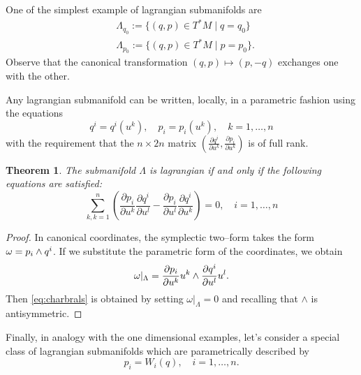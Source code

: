 \documentclass[english,fontsize=11pt,paper=a5,oneside]{scrbook}
\let\d\relax
\DeclareMathOperator{\d}{d}
\newtheorem{theorem}{Theorem}[chapter]
\theoremstyle{definition}
\newenvironment{example}
  {\pushQED{\qed}\renewcommand{\qedsymbol}{$\lozenge$}\examplex}
  {\popQED\endexamplex}
\begin{document}
\begin{example}
    One of the simplest example of lagrangian submanifolds are
    \begin{align}
        &\Lambda_{q_0} := \big\{(q,p)\in T^*M \mid q=q_0\big\}\\
        &\Lambda_{p_0} := \big\{(q,p)\in T^*M \mid p=p_0\big\}.
    \end{align}
    Observe that the canonical transformation $(q,p) \mapsto (p,-q)$ exchanges one with the other.
\end{example}

Any lagrangian submanifold can be written, locally, in a parametric fashion using the equations
\begin{equation}
    q^i = q^i(u^k), \quad p_i = p_i(u^k), \quad k=1,\ldots,n
\end{equation}
with the requirement that the $n\times2n$ matrix $\left(\frac{\partial q^i}{\partial u^k}, \frac{\partial p_i}{\partial u^k}\right)$ is of full rank.

\begin{theorem}\label{thm:charbrals}
    The submanifold $\Lambda$ is lagrangian if and only if the following equations are satisfied:
    \begin{equation}\label{eq:charbrals}
        \sum_{k,k=1}^n \left(\frac{\partial p_i}{\partial u^k}\frac{\partial q^i}{\partial u^l} - \frac{\partial p_i}{\partial u^l}\frac{\partial q^i}{\partial u^k} \right) = 0,
        \quad i=1,\ldots,n
    \end{equation}
\end{theorem}
\begin{proof}
    In canonical coordinates, the symplectic two--form takes the form $\omega = \d p_i \wedge \d q^i$. If we substitute the parametric form of the coordinates, we obtain
    \begin{equation}
        \omega |_\Lambda = \frac{\partial p_i}{\partial u^k}\d u^k \wedge \frac{\partial q^i}{\partial u^l}\d u^l.
    \end{equation}
    Then \eqref{eq:charbrals} is obtained by setting $\omega |_\Lambda = 0$ and recalling that $\wedge$ is antisymmetric.
\end{proof}

Finally, in analogy with the one dimensional examples, let's consider a special class of lagrangian submanifolds which are parametrically described by
\begin{equation}\label{eq:lagsbmPofQ}
    p_i = W_i(q), \quad i=1,\ldots,n.
\end{equation}
\end{document}
